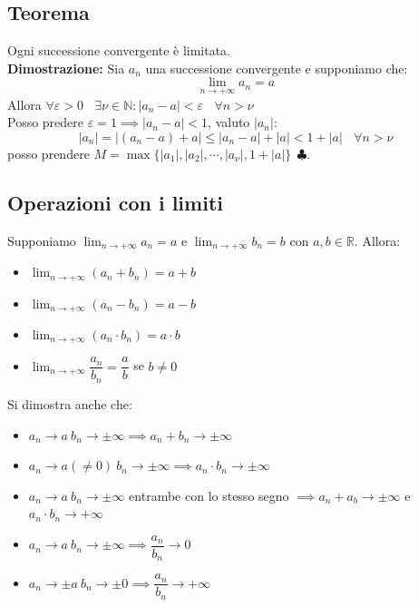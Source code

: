 \documentclass{article}
\newcommand{\R}{\mathbb{R}}
\begin{document}
\subsection{Teorema}
Ogni successione convergente è limitata.\\ \textbf{Dimostrazione:} Sia $a_n$
una successione convergente e supponiamo che:
\[
    \lim_{n\to+\infty}a_n = a
\]
Allora $\forall\varepsilon > 0 \ \ \ \ \exists \nu \in \mathbb{N} : |a_n - a| <
    \varepsilon \ \ \ \ \forall n > \nu$\\ Posso predere $\varepsilon = 1 \implies
    |a_n - a|<1$, valuto $|a_n|$:
\[
    |a_n| = |(a_n-a) + a| \leq |a_n-a| + |a| < 1 + |a| \ \ \ \ \forall n > \nu
\]
posso prendere $M = \max\{|a_1|, |a_2|, \cdots, |a_\nu|, 1+|a|\} \ \
    \clubsuit$.

\subsection{Operazioni con i limiti}
Supponiamo $\lim_{n\to+\infty} a_n = a$ e $\lim_{n\to+\infty} b_n = b$ con $a,
    b \in \R$. Allora:
\begin{itemize}
    \item $\lim_{n\to+\infty} (a_n + b_n) = a + b$
    \item $\lim_{n\to+\infty} (a_n - b_n) = a - b$
    \item $\lim_{n\to+\infty} (a_n \cdot b_n) = a \cdot b$
    \item $\lim_{n\to+\infty} \dfrac{a_n}{b_n} = \dfrac{a}{b}$ se $b \neq 0$
\end{itemize}
Si dimostra anche che:
\begin{itemize}
    \item $a_n \to a \ b_n \to \pm\infty \implies a_n + b_n \to \pm\infty$
    \item $a_n \to a (\ne0) \ b_n \to\pm\infty \implies a_n\cdot b_n \to \pm\infty$
    \item $a_n \to a \ b_n \to \pm\infty$ entrambe con lo stesso segno $\implies a_n + a_b \to \pm\infty$ e $a_n\cdot b_n \to +\infty$
    \item $a_n \to a \ b_n\to\pm\infty \implies \dfrac{a_n}{b_n} \to 0$
    \item $a_n \to \pm a \ b_n \to \pm0 \implies \dfrac{a_n}{b_n} \to +\infty$
\end{itemize}
\end{document}
